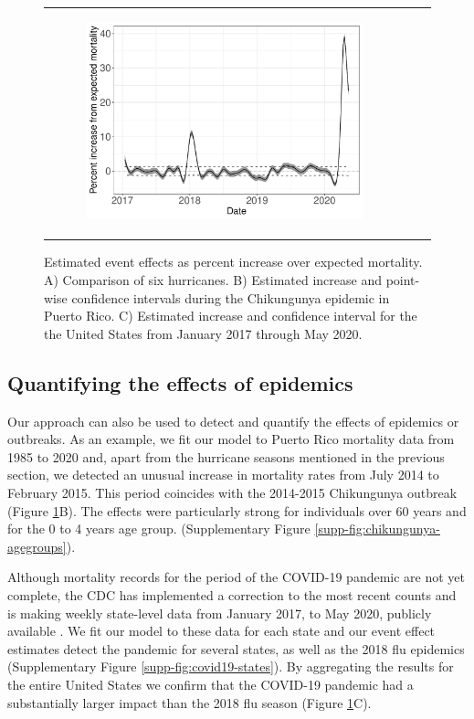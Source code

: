 \documentclass[11pt]{article}
\begin{document}
\begin{figure}[ht]
\begin{tabular}{lll}
\begin{subfigure}[t]{0.30\linewidth}
		\includegraphics[width=1\linewidth]{figs/figure-1c-usa-estimate.pdf}
	\end{subfigure}\\
    \end{tabular}
    \caption{Estimated event effects as percent increase over expected mortality. A) Comparison of six hurricanes. B) Estimated increase and point-wise confidence intervals  during the Chikungunya epidemic in Puerto Rico. C) Estimated increase and confidence interval for the the United States from January 2017 through May 2020.}
    \label{fig:fhat-estimates}
\end{figure}

\subsection{Quantifying the effects of epidemics}
\label{subsec:epidemics}
Our approach can also be used to detect and quantify the effects of epidemics or outbreaks. As an example, we fit our model to Puerto Rico mortality data from 1985 to 2020 and, apart from the hurricane seasons mentioned in the previous section, we detected an unusual increase in mortality rates from July 2014 to February 2015. This period coincides with the 2014-2015 Chikungunya outbreak \cite{sharp2016surveillance, hsu2019risk}  (Figure \ref{fig:fhat-estimates}B). The effects were particularly strong for individuals over 60 years and for the 0 to 4 years age group. (Supplementary Figure \ref{supp-fig:chikungunya-agegroups}).


Although mortality records for the period of the COVID-19 pandemic are not yet complete, the CDC has implemented a correction to the most recent counts and is making weekly state-level data from January 2017, to May 2020, publicly available \cite{cdc2020covid19}. We fit our model to these data for each state and our event effect estimates detect the pandemic for several states, as well as the 2018 flu epidemics (Supplementary Figure \ref{supp-fig:covid19-states}). By aggregating the results for the entire United States we confirm that the COVID-19 pandemic had a substantially larger impact than the 2018 flu season
(Figure \ref{fig:fhat-estimates}C).
 
\end{document}
